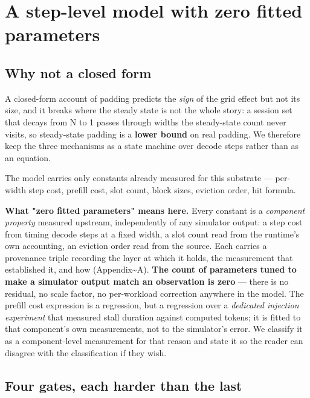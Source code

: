 
\section{A step-level model with zero fitted parameters}
\label{sec:04}

\subsection{Why not a closed form}

A closed-form account of padding predicts the \emph{sign} of the grid effect but not its size, and it breaks where the steady state is not the whole story: a session set that decays from N to 1 passes through widths the steady-state count never visits, so steady-state padding is a \textbf{lower bound} on real padding. We therefore keep the three mechanisms as a state machine over decode steps rather than as an equation.

The model carries only constants already measured for this substrate --- per-width step cost, prefill cost, slot count, block sizes, eviction order, hit formula.

\textbf{What "zero fitted parameters" means here.} Every constant is a \emph{component property} measured upstream, independently of any simulator output: a step cost from timing decode steps at a fixed width, a slot count read from the runtime's own accounting, an eviction order read from the source. Each carries a provenance triple recording the layer at which it holds, the measurement that established it, and how (Appendix\textasciitilde{}A). \textbf{The count of parameters tuned to make a simulator output match an observation is zero} --- there is no residual, no scale factor, no per-workload correction anywhere in the model. The prefill cost expression is a regression, but a regression over a \emph{dedicated injection experiment} that measured stall duration against computed tokens; it is fitted to that component's own measurements, not to the simulator's error. We classify it as a component-level measurement for that reason and state it so the reader can disagree with the classification if they wish.

\subsection{Four gates, each harder than the last}


